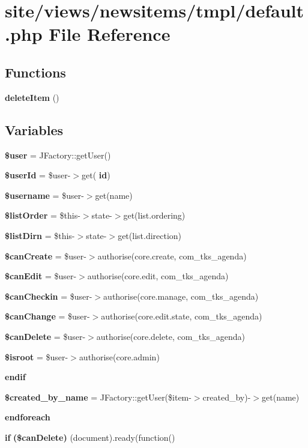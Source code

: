 \section{site/views/newsitems/tmpl/default.php File Reference}
\label{site_2views_2newsitems_2tmpl_2default_8php}
\subsection*{Functions}
\begin{DoxyCompactItemize}
\item 
\textbf{ delete\+Item} ()
\end{DoxyCompactItemize}
\subsection*{Variables}
\begin{DoxyCompactItemize}
\item 
\textbf{ \$user} = J\+Factory\+::get\+User()
\item 
\textbf{ \$user\+Id} = \$user-\/$>$get(\textquotesingle{}\textbf{ id}\textquotesingle{})
\item 
\textbf{ \$username} = \$user-\/$>$get(\textquotesingle{}name\textquotesingle{})
\item 
\textbf{ \$list\+Order} = \$this-\/$>$state-\/$>$get(\textquotesingle{}list.\+ordering\textquotesingle{})
\item 
\textbf{ \$list\+Dirn} = \$this-\/$>$state-\/$>$get(\textquotesingle{}list.\+direction\textquotesingle{})
\item 
\textbf{ \$can\+Create} = \$user-\/$>$authorise(\textquotesingle{}core.\+create\textquotesingle{}, \textquotesingle{}com\+\_\+tks\+\_\+agenda\textquotesingle{})
\item 
\textbf{ \$can\+Edit} = \$user-\/$>$authorise(\textquotesingle{}core.\+edit\textquotesingle{}, \textquotesingle{}com\+\_\+tks\+\_\+agenda\textquotesingle{})
\item 
\textbf{ \$can\+Checkin} = \$user-\/$>$authorise(\textquotesingle{}core.\+manage\textquotesingle{}, \textquotesingle{}com\+\_\+tks\+\_\+agenda\textquotesingle{})
\item 
\textbf{ \$can\+Change} = \$user-\/$>$authorise(\textquotesingle{}core.\+edit.\+state\textquotesingle{}, \textquotesingle{}com\+\_\+tks\+\_\+agenda\textquotesingle{})
\item 
\textbf{ \$can\+Delete} = \$user-\/$>$authorise(\textquotesingle{}core.\+delete\textquotesingle{}, \textquotesingle{}com\+\_\+tks\+\_\+agenda\textquotesingle{})
\item 
\textbf{ \$isroot} = \$user-\/$>$authorise(\textquotesingle{}core.\+admin\textquotesingle{})
\item 
\textbf{ endif}
\item 
\textbf{ \$created\+\_\+by\+\_\+name} = J\+Factory\+::get\+User(\$item-\/$>$created\+\_\+by)-\/$>$get(\textquotesingle{}name\textquotesingle{})
\item 
\textbf{ endforeach}
\item 
\textbf{ if} \textbf{ (\$can\+Delete)} (document).ready(function()
\end{DoxyCompactItemize}


